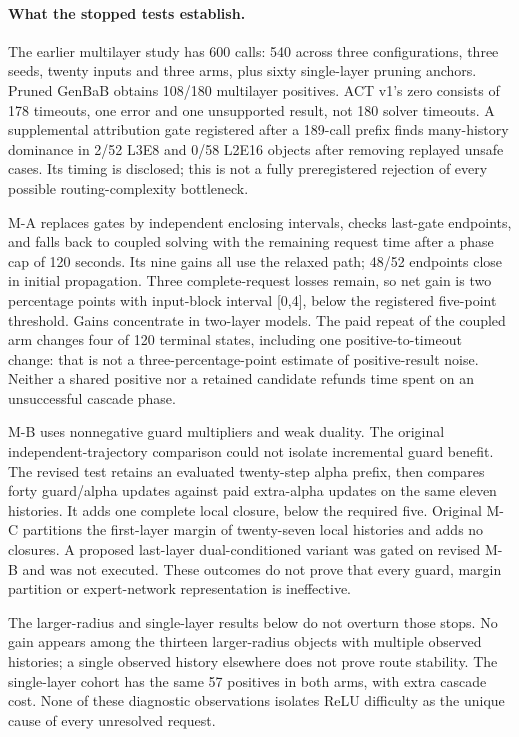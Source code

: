\paragraph{What the stopped tests establish.}
The earlier multilayer study has 600 calls: 540 across three configurations,
three seeds, twenty inputs and three arms, plus sixty single-layer pruning
anchors. Pruned GenBaB obtains 108/180 multilayer positives. ACT v1's zero
consists of 178 timeouts, one error and one unsupported result, not 180 solver
timeouts. A supplemental attribution gate registered after a 189-call prefix
finds many-history dominance in 2/52 L3E8 and 0/58 L2E16 objects after removing
replayed unsafe cases. Its timing is disclosed; this is not a fully
preregistered rejection of every possible routing-complexity bottleneck.

M-A replaces gates by independent enclosing intervals, checks last-gate
endpoints, and falls back to coupled solving with the remaining request time
after a phase cap of 120 seconds. Its nine gains all use the relaxed path;
48/52 endpoints close in initial propagation. Three complete-request losses
remain, so net gain is two percentage points with input-block interval [0,4],
below the registered five-point threshold. Gains concentrate in two-layer
models. The paid repeat of the coupled arm changes four of 120 terminal states,
including one positive-to-timeout change: that is not a three-percentage-point
estimate of positive-result noise. Neither a shared positive nor a retained
candidate refunds time spent on an unsuccessful cascade phase.

M-B uses nonnegative guard multipliers and weak duality. The original
independent-trajectory comparison could not isolate incremental guard benefit.
The revised test retains an evaluated twenty-step alpha prefix, then compares
forty guard/alpha updates against paid extra-alpha updates on the same eleven
histories. It adds one complete local closure, below the required five.
Original M-C partitions the first-layer margin of twenty-seven local histories
and adds no closures. A proposed last-layer dual-conditioned variant was gated
on revised M-B and was not executed. These outcomes do not prove that every
guard, margin partition or expert-network representation is ineffective.

The larger-radius and single-layer results below do not overturn those stops.
No gain appears among the thirteen larger-radius objects with multiple observed
histories; a single observed history elsewhere does not prove route stability.
The single-layer cohort has the same 57 positives in both arms, with extra
cascade cost. None of these diagnostic observations isolates ReLU difficulty
as the unique cause of every unresolved request.

